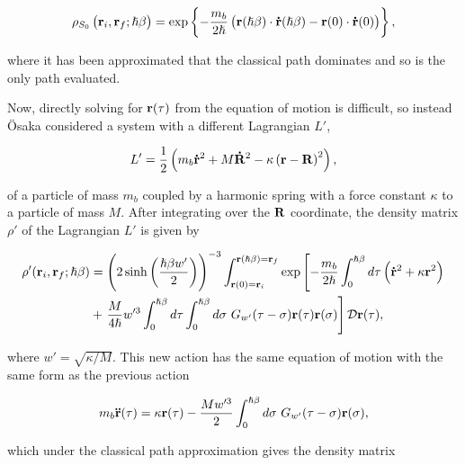 \begin{equation}
    \rho_{S_0}\left(\vb{r}_i, \vb{r}_f; \hslash\beta\right) = \exp \left\{-\frac{m_b}{2\hslash}\left( \vb{r}(\hslash\beta) \cdot \vb{\dot{r}}(\hslash\beta) - \vb{r}(0) \cdot \vb{\dot{r}}(0) \right)\right\},
\end{equation}

where it has been approximated that the classical path dominates and so is the only path evaluated. 

Now, directly solving for $\vb{r}(\tau)$ from the equation of motion is difficult, so instead \"Osaka considered a system with a different Lagrangian $L'$,

\begin{equation}
    L' = \frac{1}{2} \left( m_b\vb{\dot{r}}^2 + M\vb{\dot{R}}^2 - \kappa \left( \vb{r} - \vb{R} \right)^2 \right),
\end{equation}

of a particle of mass $m_b$ coupled by a harmonic spring with a force constant $\kappa$ to a particle of mass $M$. After integrating over the $\vb{R}$ coordinate, the density matrix $\rho'$ of the Lagrangian $L'$ is given by

\begin{equation}
    \begin{aligned}
        \rho'(\vb{r}_i, \vb{r}_f; \hslash\beta) &= \left(2 \sinh\left(\frac{\hslash\beta w'}{2}\right)\right)^{-3} \int_{\vb{r}(0) = \vb{r}_i}^{\vb{r}(\hslash\beta) = \vb{r}_f} \exp \left[-\frac{m_b}{2\hslash} \int_0^{\hslash\beta} d\tau \left(\vb{\dot{r}}^2 + \kappa \vb{r}^2\right)\right. \\
        &+ \left.\frac{M}{4\hslash} w'^3 \int^{\hslash\beta}_0 d\tau \int^{\hslash\beta}_0 d\sigma\ G_{w'}(\tau - \sigma) \vb{r}(\tau) \vb{r}(\sigma) \right] \mathcal{D}\vb{r}(\tau),
    \end{aligned}
\end{equation}

where $w' = \sqrt{\kappa / M}$. This new action has the same equation of motion with the same form as the previous action

\begin{equation}\label{eqn:osaka_eom}
    m_b \vb{\ddot{r}}(\tau) = \kappa \vb{r}(\tau) - \frac{Mw'^3}{2} \int^{\hslash\beta}_0 d\sigma\ G_{w'}(\tau - \sigma) \vb{r}(\sigma),
\end{equation}

which under the classical path approximation gives the density matrix

